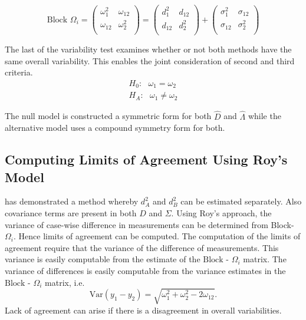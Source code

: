 \documentclass[12pt, a4paper]{report}
\theoremstyle{plain}
\theoremstyle{definition}
\theoremstyle{remark}
\begin{document}
	\begin{center}
		\[\mbox{Block } {\Omega}_i = \left(\begin{array}{cc}
		\omega^2_1  & \omega_{12} \\
		\omega_{12} & \omega^2_2 \\
		\end{array}  \right)
		=  \left(
		\begin{array}{cc}
		d^2_1  & d_{12} \\
		d_{12} & d^2_2 \\
		\end{array} \right)+
		\left(
		\begin{array}{cc}
		\sigma^2_1  & \sigma_{12} \\
		\sigma_{12} & \sigma^2_2 \\
		\end{array}\right)
		\]
	\end{center}
	
	The last of the variability test examines whether or not both methods have the same overall variability. This enables the joint consideration of second and third criteria.
	\begin{eqnarray*}
		H_{0}: \mbox{ }\omega_{1}  = \omega_{2} \\
		H_{A}: \mbox{ }\omega_{1}  \neq \omega_{2}
	\end{eqnarray*}
	
	The null model is constructed a symmetric form for both ${\hat{D}}$ and ${\hat{\Lambda}}$ while the alternative model uses a compound symmetry form for both.
	
	
	
	
	
	
	\subsection{Computing Limits of Agreement Using Roy's Model}
	\citet{ARoy2009} has demonstrated a method whereby $d^2_{A}$ and $d^2_{B}$ can be estimated separately. Also covariance terms are present in both ${D}$ and ${\Sigma}$. Using Roy's approach, the variance of case-wise difference in measurements can be determined from Block-${\Omega}_{i}$. Hence limits of agreement can be computed. The computation of the limits of agreement require that the variance of the difference of measurements. This variance is easily computable from the estimate of the ${\mbox{Block - } \Omega_{i}}$ matrix.
	The variance of differences is easily computable from the variance estimates in the ${\mbox{Block - } \Omega_{i}}$ matrix, i.e.
	\[
	\mathrm{Var}(y_1 - y_2) = \sqrt{ \omega^2_1 + \omega^2_2 - 2\omega_{12}}.
	\]	
	Lack of agreement can arise if there is a disagreement in overall variabilities. 
	
\end{document}
